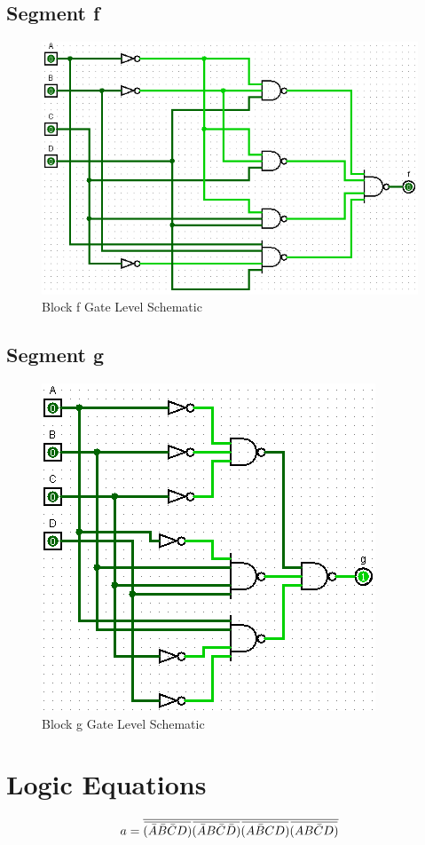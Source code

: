 \documentclass[12pt]{article}
\newcommand{\overbar}[1]{\mkern 1.5mu\overline{\mkern-1.5mu#1\mkern-1.5mu}\mkern 1.5mu} %
\begin{document}
\subsection{Segment f}
\begin{figure}[H]
	\centering
	\label{fig:fBlockGates}
	\includegraphics[width=0.65\linewidth, keepaspectratio]{f_logicCkt}
	\caption{Block f Gate Level Schematic}
\end{figure}

\subsection{Segment g}
\begin{figure}[H]
	\centering
	\label{fig:gBlockGates}
	\includegraphics[width=0.65\linewidth, keepaspectratio]{g_logicCkt}
	\caption{Block g Gate Level Schematic}
\end{figure}


\newpage
\section{Logic Equations}
\label{app:logicEquations}
\begin{equation}
a = \overline{\overbar{(\bar{A}\bar{B}\bar{C}D)}\overbar{(\bar{A}B\bar{C}\bar{D})}\overbar{(A\bar{B}CD)}\overbar{(AB\bar{C}D)}}
\end{equation}
\end{document}
